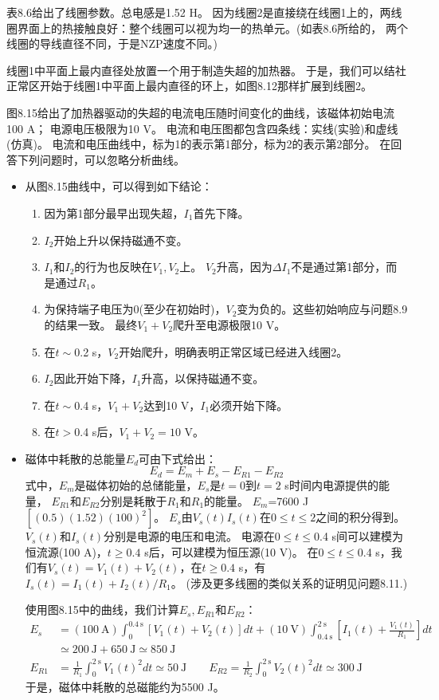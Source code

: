 表8.6给出了线圈参数。总电感是1.52 H。
因为线圈2是直接绕在线圈1上的，两线圈界面上的热接触良好：整个线圈可以视为均一的热单元。(如表8.6所给的，
两个线圈的导线直径不同，于是NZP速度不同。)

线圈1中平面上最内直径处放置一个用于制造失超的加热器。
于是，我们可以结社正常区开始于线圈1中平面上最内直径的环上，如图8.12那样扩展到线圈2。

图8.15给出了加热器驱动的失超的电流电压随时间变化的曲线，该磁体初始电流100 A；
电源电压极限为10 V。
电流和电压图都包含四条线：实线(实验)和虚线(仿真)。
电流和电压曲线中，标为1的表示第1部分，标为2的表示第2部分。
在回答下列问题时，可以忽略分析曲线。

\begin{itemize}
\item 从图8.15曲线中，可以得到如下结论：
	\begin{enumerate}
		\item  因为第1部分最早出现失超，$I_1$首先下降。
		\item $I_2$开始上升以保持磁通不变。
		\item $I_1$和$I_2$的行为也反映在$V_1,V_2$上。
		$V_2$升高，因为$\Delta I_1$不是通过第1部分，而是通过$R_1$。
		\item 为保持端子电压为0(至少在初始时)，$V_2$变为负的。这些初始响应与问题8.9的结果一致。
		最终$V_1+V_2$爬升至电源极限10 V。
		\item 在$t\sim$0.2 s，$V_2$开始爬升，明确表明正常区域已经进入线圈2。
		\item $I_2$因此开始下降，$I_1$升高，以保持磁通不变。
		\item 在$t\sim$0.4 s，$V_1+V_2$达到10 V，$I_1$必须开始下降。
		\item 在$t>$0.4 s后，$V_1+V_2=10$ V。
	\end{enumerate}
\item 磁体中耗散的总能量$E_d$可由下式给出：
\begin{equation}%
E_d=E_m+E_s-E_{R1}-E_{R2}
\end{equation}
式中，$E_m$是磁体初始的总储能量，$E_s$是$t=0$到$t=2$ s时间内电源提供的能量，
$E_{R1}$和$E_{R2}$分别是耗散于$R_1$和$R_1$的能量。
$E_m$=7600 J$[(0.5)(1.52)(100)^2]$。
$E_s$由$V_s(t)I_s(t)$在$0\le t\le 2$之间的积分得到。
$V_s(t)$和$I_s(t)$分别是电源的电压和电流。
电源在$0\le t\le$0.4 s间可以建模为恒流源(100 A)，$t\ge 0.4$ s后，可以建模为恒压源(10 V)。
在$0\le t\le$0.4 s，我们有$V_s(t)=V_1(t)+V_2(t)$，在$t\ge 0.4$ s，有$I_s(t)=I_1(t)+I_2(t)/R_1$。
(涉及更多线圈的类似关系的证明见问题8.11.)

使用图8.15中的曲线，我们计算$E_s,E_{R1}$和$E_{R2}$：
\begin{align*}
E_s&=(100\ \mathrm{A})\int_{0}^{0.4\ \mathrm{s}}[V_1(t)+V_2(t)]dt+(10\ \mathrm{V})\int_{0.4\ \mathrm{s}}^{2\ \mathrm{s}}\left[I_1(t)+\frac{V_1(t)}{R_1}\right]dt \\
&\simeq 200\ \mathrm{J}+650\ \mathrm{J}\simeq 850\ \mathrm{J}\\
E_{R1}&=\frac{1}{R_1}\int_{0}^{2\ \mathrm{s}}V_1(t)^2dt\simeq 50\ \mathrm{J} \qquad
E_{R2}=\frac{1}{R_2}\int_{0}^{2\ \mathrm{s}}V_2(t)^2dt\simeq 300\ \mathrm{J}
\end{align*}
于是，磁体中耗散的总磁能约为5500 J。


\end{itemize}
